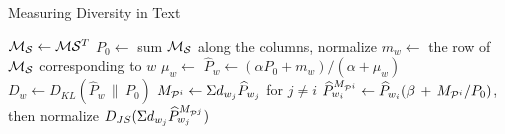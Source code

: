 \begin{algorithm}
  \caption{Measuring Diversity in Text}
\label{alg}
  \begin{algorithmic} 
   \State ${\mathcal M}_{\mathcal S} \leftarrow {\mathcal M}{\mathcal S}^T$
   \State $P_0 \leftarrow $ sum ${\mathcal M}_{\mathcal S}$ along the columns, normalize  
    \State $m_w \leftarrow $ the row of ${\mathcal M}_{\mathcal S}$ corresponding to $w$
    \State $\mu_w \leftarrow  $ 
    \State $\widehat{P}_w\leftarrow (\alpha P_0 + m_w) /
    (\alpha+\mu_w)$
    \State $D_w \leftarrow D_{KL}(\widehat{P}_w\,\|\,P_0)$
   \EndFor
  \EndProcedure
    \State $M_{{\mathcal P}^i} \leftarrow \Sigma d_{w_j} \widehat{P}_{w_j}$ for
    $j\neq i$
    \State $\widehat{P}^{M_{{\mathcal P}^i}}_{w_i}\leftarrow
    \widehat{P}_{w_i}(\beta\, +\, M_{{\mathcal P}^i}/P_0)$, then normalize
   \EndFor
   \State\Return $D_{JS}(\Sigma d_{w_j}
   \widehat{P}^{M_{{\mathcal P}^j}}_{w_j})$
  \EndProcedure

  \end{algorithmic}
\end{algorithm}




